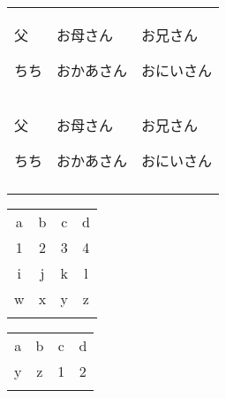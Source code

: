 \documentclass[12pt,a4j, landscape, dvipdfmx]{utarticle}
\def\cell(#1,#2){\rule{0pt}{3ex} \hspace*{-.4cm} {\LARGE #1} \newline \rule{0pt}{4ex} \hspace*{1cm} {\small #2}}
\begin{document}
\newcommand\T{\rule{0pt}{2.6ex}} 


\begin{tabular}{||p{3.5cm} || p{3.5cm} || p{3.5cm} ||}
\hhline{|t|t|t|}
 \cell(父,ちち) & \cell(お母さん,おかあさん) & \cell(お兄さん,おにいさん) \tabularnewline 
\hhline{|~|~|~|}
 \cell(父,ちち) & \cell(お母さん,おかあさん) & \cell(お兄さん,おにいさん) \tabularnewline
 
\hhline{|b|b|b|}
\end{tabular} 

\begin{tabular}{||cc||c|c||}
\hhline{|t:==:t:==:t|}
a&b&c&d\\
\hhline{|:==:|~|~||}
1&2&3&4\\
\hhline{#==#~|=#}
i&j&k&l\\
\hhline{||--||--||}
w&x&y&z\\
\hhline{|b:==:b:==:b|}
\end{tabular}

\begin{tabular}{||cc||cc||}
\hhline{|t:==:t|t:==:t|}
a&b&c&d\\
\hhline{||--||--||}
y&z&1&2\\
\hhline{|b:==:b:==:b|}
\end{tabular}
\end{document}
